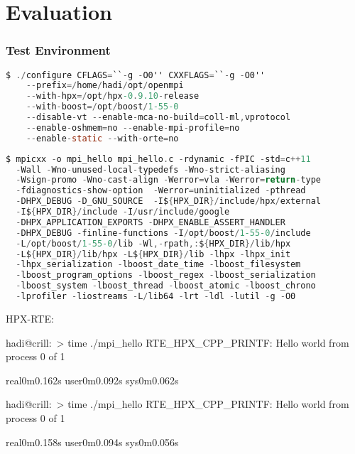 \chapter{Evaluation}
\label{sec:Evaluation}

\subsection{Test Environment}

\begin{lstlisting}[language=C, frame=single, basicstyle=\footnotesize, caption=Configure Line of Open MPI with HPX-RTE\label{lst:config-hpxrte}]
  $ ./configure CFLAGS=``-g -O0'' CXXFLAGS=``-g -O0''
    --prefix=/home/hadi/opt/openmpi
    --with-hpx=/opt/hpx-0.9.10-release
    --with-boost=/opt/boost/1-55-0
    --disable-vt --enable-mca-no-build=coll-ml,vprotocol
    --enable-oshmem=no --enable-mpi-profile=no
    --enable-static --with-orte=no
\end{lstlisting}


\begin{lstlisting}[language=C, frame=single, basicstyle=\footnotesize, caption=Compile line for Hello World\label{lst:compile}]
  $ mpicxx -o mpi_hello mpi_hello.c -rdynamic -fPIC -std=c++11
  -Wall -Wno-unused-local-typedefs -Wno-strict-aliasing
  -Wsign-promo -Wno-cast-align -Werror=vla -Werror=return-type
  -fdiagnostics-show-option  -Werror=uninitialized -pthread
  -DHPX_DEBUG -D_GNU_SOURCE  -I${HPX_DIR}/include/hpx/external
  -I${HPX_DIR}/include -I/usr/include/google
  -DHPX_APPLICATION_EXPORTS -DHPX_ENABLE_ASSERT_HANDLER
  -DHPX_DEBUG -finline-functions -I/opt/boost/1-55-0/include
  -L/opt/boost/1-55-0/lib -Wl,-rpath,:${HPX_DIR}/lib/hpx
  -L${HPX_DIR}/lib/hpx -L${HPX_DIR}/lib -lhpx -lhpx_init
  -lhpx_serialization -lboost_date_time -lboost_filesystem
  -lboost_program_options -lboost_regex -lboost_serialization
  -lboost_system -lboost_thread -lboost_atomic -lboost_chrono
  -lprofiler -liostreams -L/lib64 -lrt -ldl -lutil -g -O0
\end{lstlisting}

HPX-RTE:

hadi@crill:~> time ./mpi_hello
RTE_HPX_CPP_PRINTF: Hello world from process 0 of 1

real0m0.162s
user0m0.092s
sys0m0.062s


hadi@crill:~> time ./mpi_hello
RTE_HPX_CPP_PRINTF: Hello world from process 0 of 1

real0m0.158s
user0m0.094s
sys0m0.056s


